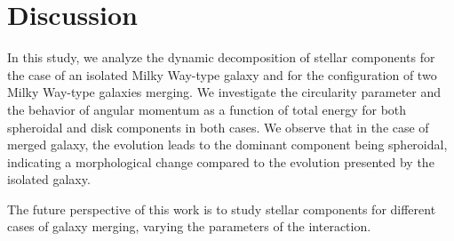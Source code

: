 \documentclass[baaa]{baaa}
\begin{document}
\section{Discussion}
\label{sec:discussion}

In this study, we analyze the dynamic decomposition of stellar components for the case of an isolated Milky Way-type galaxy and for the configuration of two Milky Way-type galaxies merging. We investigate the circularity parameter and the behavior of angular momentum as a function of total energy for both spheroidal and disk components in both cases. We observe that in the case of merged galaxy, the evolution leads to the dominant component being spheroidal, indicating a morphological change compared to the evolution presented by the isolated galaxy.

The future perspective of this work is to study stellar components for different cases of galaxy merging, varying the parameters of the interaction.


\small

 
\end{document}

